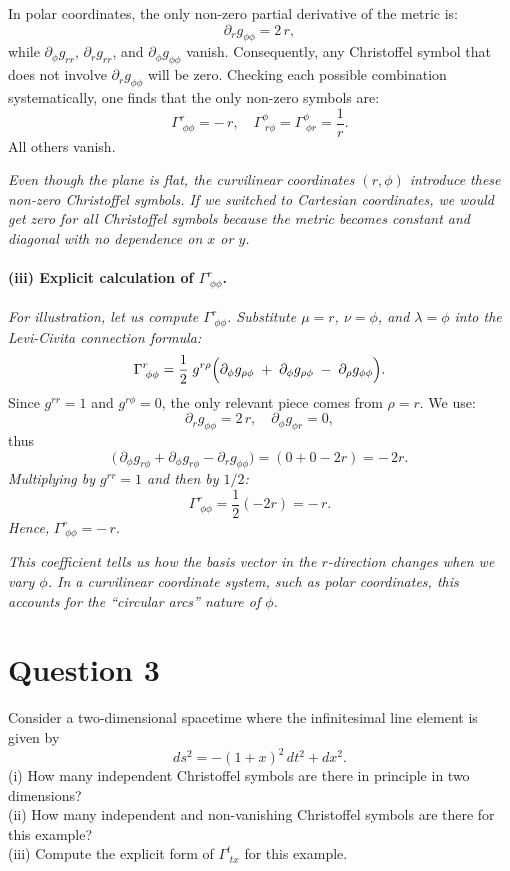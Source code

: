 In polar coordinates, the only non-zero partial derivative of the metric is:
\[
\partial_r g_{\phi\phi} = 2\,r,
\]
while \(\partial_\phi g_{rr}\), \(\partial_r g_{rr}\), and \(\partial_\phi g_{\phi\phi}\) vanish. Consequently, any Christoffel symbol that does not involve \(\partial_r g_{\phi\phi}\) will be zero. Checking each possible combination systematically, one finds that the only non-zero symbols are:
\[
\Gamma^r_{\;\phi\phi} = -\,r,
\quad
\Gamma^\phi_{\;r\phi} = \Gamma^\phi_{\;\phi r} = \frac{1}{r}.
\]
All others vanish.

\emph{Even though the plane is flat, the curvilinear coordinates \((r,\phi)\) introduce these non-zero Christoffel symbols. If we switched to Cartesian coordinates, we would get zero for all Christoffel symbols because the metric becomes constant and diagonal with no dependence on \(x\) or \(y\).}

\paragraph{(iii) Explicit calculation of \(\Gamma^r_{\;\phi\phi}\).}

\emph{For illustration, let us compute \(\Gamma^r_{\;\phi\phi}\). Substitute \(\mu = r\), \(\nu = \phi\), and \(\lambda = \phi\) into the Levi-Civita connection formula:}
\[
\Gamma^r_{\;\phi\phi}
=
\frac{1}{2}
\;g^{r\rho}
\Bigl(
\partial_\phi g_{\rho\phi}
\;+\;
\partial_\phi g_{\rho\phi}
\;-\;
\partial_\rho g_{\phi\phi}
\Bigr).
\]
Since \(g^{rr} = 1\) and \(g^{r\phi} = 0\), the only relevant piece comes from \(\rho = r\). We use:
\[
\partial_r g_{\phi\phi} = 2\,r,
\quad
\partial_\phi g_{\phi r} = 0,
\]
thus
\[
\bigl(\,\partial_\phi g_{r\phi} + \partial_\phi g_{r\phi} - \partial_r g_{\phi\phi}\bigr)
=
(0 + 0 - 2r)
=
-\,2r.
\]
\emph{Multiplying by \(g^{rr} = 1\) and then by \(1/2\):}
\[
\Gamma^r_{\;\phi\phi}
=
\frac12 (-2r)
=
-\,r.
\]
\emph{Hence,}
\(\boxed{\Gamma^r_{\;\phi\phi} = -\,r}.\)

\emph{This coefficient tells us how the basis vector in the \(r\)-direction changes when we vary \(\phi\). In a curvilinear coordinate system, such as polar coordinates, this accounts for the “circular arcs” nature of \(\phi\).}

\pagebreak

\section*{Question 3}

Consider a two-dimensional spacetime where the infinitesimal line element is given by
\[
ds^2 = -(1+x)^2 \, dt^2 + dx^2.
\]
(i) How many independent Christoffel symbols are there in principle in two dimensions?\\
(ii) How many independent and non-vanishing Christoffel symbols are there for this example?\\
(iii) Compute the explicit form of \(\Gamma^{t}_{\;tx}\) for this example.

